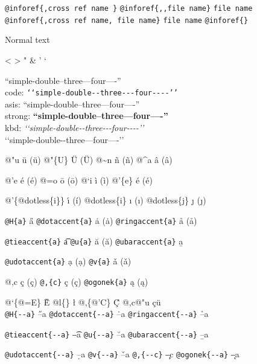 \documentclass{book}
\newcommand\Texinfocommandstyletextkbd[1]{{\ttfamily\textsl{#1}}}%
\renewcommand{\_}{\Texinfounderscore\discretionary{}{}{}}
\begin{document}
\texttt{@inforef\{,cross ref name \}} 
\texttt{@inforef\{{,}{,}file name\}} \texttt{file name}
\texttt{@inforef\{,cross ref name,\ file name\}} \texttt{file name}
\texttt{@inforef\{\}} 



Normal text

<
>
"
\&
'
`

``simple-double--three---four----''\leavevmode{}\\
code: \texttt{{`}{`}simple-double{-}{-}three{-}{-}{-}four{-}{-}{-}-{'}{'}} \leavevmode{}\\
asis: ``simple-double--three---four----'' \leavevmode{}\\
strong: \textbf{``simple-double--three---four----''} \leavevmode{}\\
kbd: \Texinfocommandstyletextkbd{{`}{`}simple-double{-}{-}three{-}{-}{-}four{-}{-}{-}-{'}{'}} \leavevmode{}\\

`\hbox{}`simple-double-\hbox{}-three---four----'\hbox{}'\leavevmode{}\\

%
%
%
%

@"u \"{u} (ü)
@"\{U\} \"{U} (Ü) 
@\~{}n \~{n} (ñ)
@\^{}a \^{a} (â)

@'e \'{e} (é)
@=o \={o} (ō)
@`i \`{i} (ì)
@'\{e\} \'{e} (é)

@'\{@dotless\{i\}\} \'{\i{}} (í)
@dotless\{i\} \i{} (ı)
@dotless\{j\} \j{} (ȷ)

\texttt{@H\{a\}} \H{a}
\texttt{@dotaccent\{a\}} \.{a} (ȧ)
\texttt{@ringaccent\{a\}} \r{a} (å)

\texttt{@tieaccent\{a\}} \t{a}
\texttt{@u\{a\}} \u{a} (ă)
\texttt{@ubaraccent\{a\}} \b{a}

\texttt{@udotaccent\{a\}} \d{a} (ạ)
\texttt{@v\{a\}} \v{a} (ǎ)

@,c \c{c} (ç)
\texttt{@,\{c\}} \c{c} (ç)
\texttt{@ogonek\{a\}} \k{a} (ą)

@`\{@=E\} \`{\={E}}
@l\{\} \l{}
@,\{@'C\} \c{\'{C}}
@,c@"u \c{c}\"{u} \leavevmode{}\\

\texttt{@H\{{-}{-}a\}} \H{--a}
\texttt{@dotaccent\{{-}{-}a\}} \.{--a}
\texttt{@ringaccent\{{-}{-}a\}} \r{--a}

\texttt{@tieaccent\{{-}{-}a\}} \t{--a}
\texttt{@u\{{-}{-}a\}} \u{--a}
\texttt{@ubaraccent\{{-}{-}a\}} \b{--a}

\texttt{@udotaccent\{{-}{-}a\}} \d{--a}
\texttt{@v\{{-}{-}a\}} \v{--a}
\texttt{@,\{{-}{-}c\}} \c{--c}
\texttt{@ogonek\{{-}{-}a\}} \k{--a}
\end{document}
